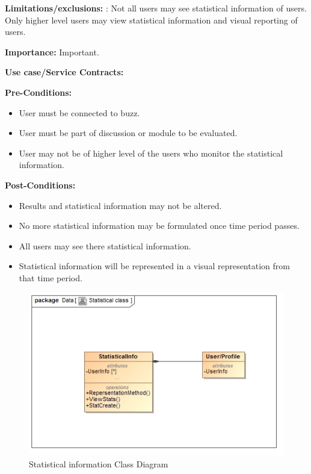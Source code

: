 \documentclass[11pt]{article}
\begin{document}
\begin{enumerate}
\textbf{Limitations/exclusions:} : Not all users may see statistical information of users. Only higher level users may view statistical information and visual reporting of users.

 
\textbf{Importance:} Important.


\textbf{Use case/Service Contracts:} 

\textbf{Pre-Conditions: }
\begin{itemize}
\item User must be connected to buzz.

\item User must be part of discussion or module to be evaluated.

\item User may not be of higher level of the users who monitor the statistical information.


\end{itemize}
 

\textbf{Post-Conditions: }
\begin{itemize}

\item Results and statistical information may not be altered.
\item No more statistical information may be formulated once time period passes.
\item All users may see there statistical information.
\item Statistical information will be represented in a visual representation from that time period.



\end{itemize}

\graphicspath{ {../Diagrams/Matt/Class/} }
	  \begin{figure}[H]	
    	\includegraphics[scale=0.5]{StatisticalClass.jpg}
    	\caption{Statistical information Class Diagram}
	\end{figure}


\end{enumerate}
\end{document}
